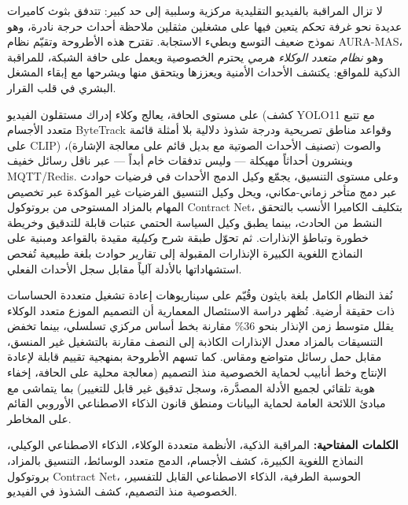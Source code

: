 \documentclass[openany,12pt,oneside]{extreport}
\begin{document}
\begin{Arabic}
لا تزال المراقبة بالفيديو التقليدية مركزية وسلبية إلى حد كبير: تتدفق بثوث كاميرات عديدة نحو غرفة تحكم يتعين فيها على مشغلين مثقلين ملاحظة أحداث حرجة نادرة، وهو نموذج ضعيف التوسع وبطيء الاستجابة. تقترح هذه الأطروحة وتقيّم نظام \textenglish{AURA-MAS}، وهو \emph{نظام متعدد الوكلاء هرمي} يحترم الخصوصية ويعمل على حافة الشبكة، للمراقبة الذكية للمواقع: يكتشف الأحداث الأمنية ويعززها ويتحقق منها ويشرحها مع إبقاء المشغل البشري في قلب القرار.

على مستوى الحافة، يعالج وكلاء إدراك مستقلون الفيديو (كشف \textenglish{YOLO11} مع تتبع متعدد الأجسام \textenglish{ByteTrack} وقواعد مناطق تصريحية ودرجة شذوذ دلالية بلا أمثلة قائمة على \textenglish{CLIP}) والصوت (تصنيف الأحداث الصوتية مع بديل قائم على معالجة الإشارة)، وينشرون أحداثاً مهيكلة --- وليس تدفقات خام أبداً --- عبر ناقل رسائل خفيف \textenglish{MQTT/Redis}. وعلى مستوى التنسيق، يجمّع وكيل الدمج الأحداث في فرضيات حوادث عبر دمج متأخر زماني-مكاني، ويحل وكيل التنسيق الفرضيات غير المؤكدة عبر تخصيص المهام بالمزاد المستوحى من بروتوكول \textenglish{Contract Net}، بتكليف الكاميرا الأنسب بالتحقق النشط من الحادث، بينما يطبق وكيل السياسة الحتمي عتبات قابلة للتدقيق وخريطة خطورة وتباطؤ الإنذارات. ثم تحوّل طبقة شرح \emph{وكيلية} مقيدة بالقواعد ومبنية على النماذج اللغوية الكبيرة الإنذارات المقبولة إلى تقارير حوادث بلغة طبيعية تُفحص استشهاداتها بالأدلة آلياً مقابل سجل الأحداث الفعلي.

نُفذ النظام الكامل بلغة بايثون وقُيّم على سيناريوهات إعادة تشغيل متعددة الحساسات ذات حقيقة أرضية. تُظهر دراسة الاستئصال المعمارية أن التصميم الموزع متعدد الوكلاء يقلل متوسط زمن الإنذار بنحو \textenglish{36\%} مقارنة بخط أساس مركزي تسلسلي، بينما تخفض التنسيقات بالمزاد معدل الإنذارات الكاذبة إلى النصف مقارنة بالتشغيل غير المنسق، مقابل حمل رسائل متواضع ومقاس. كما تسهم الأطروحة بمنهجية تقييم قابلة لإعادة الإنتاج وخط أنابيب لحماية الخصوصية منذ التصميم (معالجة محلية على الحافة، إخفاء هوية تلقائي لجميع الأدلة المصدَّرة، وسجل تدقيق غير قابل للتغيير) بما يتماشى مع مبادئ اللائحة العامة لحماية البيانات ومنطق قانون الذكاء الاصطناعي الأوروبي القائم على المخاطر.

\vskip 0.5cm
{\small \textbf{الكلمات المفتاحية:} المراقبة الذكية، الأنظمة متعددة الوكلاء، الذكاء الاصطناعي الوكيلي، النماذج اللغوية الكبيرة، كشف الأجسام، الدمج متعدد الوسائط، التنسيق بالمزاد، بروتوكول \textenglish{Contract Net}، الحوسبة الطرفية، الذكاء الاصطناعي القابل للتفسير، الخصوصية منذ التصميم، كشف الشذوذ في الفيديو.}
\end{Arabic}

\newpage
\end{document}
